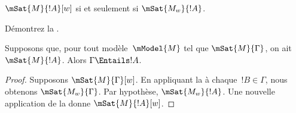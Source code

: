 \documentclass[../../../include/open-logic-section]{subfiles}
\begin{document}
\begin{prop}
  $\mSat{M}{!A}[w]$ si et seulement si $\mSat{M_w}{!A}$.
\end{prop}

\begin{prob}
  Démontrez la .
\end{prob}

\begin{prop}
  Supposons que, pour tout modèle~$\mModel{M}$ tel que
  $\mSat{M}{\Gamma}$, on ait $\mSat{M}{!A}$. Alors
  $\Gamma \Entails !A$.
\end{prop}

\begin{proof}
  Supposons $\mSat{M}{\Gamma}[w]$. En appliquant
  la  à chaque~$!B \in \Gamma$, nous obtenons
  $\mSat{M_w}{\Gamma}$. Par hypothèse,
  $\mSat{M_w}{!A}$. Une nouvelle application de la
   donne $\mSat{M}{!A}[w]$.
\end{proof}
\end{document}
